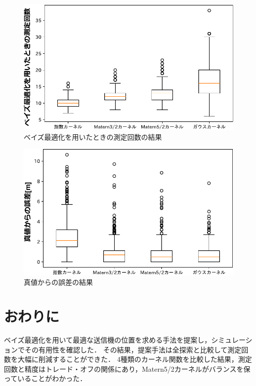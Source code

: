 \documentclass[twocolumn]{ltjarticle}
\begin{document}
\setlength\intextsep{3pt}
\setlength\textfloatsep{3pt}
\begin{figure}[H]
	\centering
	\includegraphics[width=0.8\linewidth]{./figures/material_8_count_box.pdf}
	\vspace*{-0.4cm}
	\caption{ベイズ最適化を用いたときの測定回数の結果} \label{fig:result_count}
\end{figure}
\vspace*{-0.1cm}
\begin{figure}[H]
	\centering
	\includegraphics[width=0.8\linewidth]{./figures/material_8_distance_box.pdf}
	\vspace*{-0.4cm}
	\caption{真値からの誤差の結果} \label{fig:result_error}
\end{figure}

\section{おわりに}

ベイズ最適化を用いて最適な送信機の位置を求める手法を提案し，シミュレーションでその有用性を確認した．
その結果，提案手法は全探索と比較して測定回数を大幅に削減することができた．
4種類のカーネル関数を比較した結果，測定回数と精度はトレード・オフの関係にあり，Matern5/2カーネルがバランスを保っていることがわかった．

\vspace{2mm}

\begin{spacing}{0.65}
	\printbibliography[title=参考文献]
\end{spacing}
\end{document}
